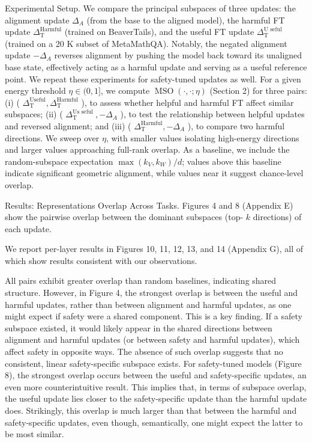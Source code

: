 \documentclass[10pt]{article}
\begin{document}
Experimental Setup. We compare the principal subspaces of three updates: the alignment update $\Delta_{A}$ (from the base to the aligned model), the harmful FT update $\Delta_{\mathrm{T}}^{\mathrm{Harmful}}$ (trained on BeaverTails), and the useful FT update $\Delta_{\mathrm{T}}^{\mathrm{U} \text { seful }}$ (trained on a 20 K subset of MetaMathQA). Notably, the negated alignment update $-\Delta_{A}$ reverses alignment by pushing the model back toward its unaligned base state, effectively acting as a harmful update and serving as a useful reference point. We repeat these experiments for safety-tuned updates as well. For a given energy threshold $\eta \in(0,1]$, we compute $\operatorname{MSO}(\cdot, \cdot ; \eta)$ (Section 2) for three pairs: (i) ( $\Delta_{\mathrm{T}}^{\mathrm{Useful}}, \Delta_{\mathrm{T}}^{\mathrm{Harmful}}$ ), to assess whether helpful and harmful FT affect similar subspaces; (ii) ( $\Delta_{\mathrm{T}}^{\mathrm{Us} \text { seful }},-\Delta_{A}$ ), to test the relationship between helpful updates and reversed alignment; and (iii) ( $\Delta_{\mathrm{T}}^{\mathrm{Harmful}},-\Delta_{A}$ ), to compare two harmful directions. We sweep over $\eta$, with smaller values isolating high-energy directions and larger values approaching full-rank overlap. As a baseline, we include the random-subspace expectation $\max \left(k_{V}, k_{W}\right) / d$; values above this baseline indicate significant geometric alignment, while values near it suggest chance-level overlap.

Results: Representations Overlap Across Tasks. Figures 4 and 8 (Appendix E) show the pairwise overlap between the dominant subspaces (top- $k$ directions) of each update.

We report per-layer results in Figures 10, 11, 12, 13, and 14 (Appendix G), all of which show results consistent with our observations.

All pairs exhibit greater overlap than random baselines, indicating shared structure. However, in Figure 4, the strongest overlap is between the useful and harmful updates, rather than between alignment and harmful updates, as one might expect if safety were a shared component. This is a key finding. If a safety subspace existed, it would likely appear in the shared directions between alignment and harmful updates (or between safety and harmful updates), which affect safety in opposite ways. The absence of such overlap suggests that no consistent, linear safety-specific subspace exists. For safety-tuned models (Figure 8), the strongest overlap occurs between the useful and safety-specific updates, an even more counterintuitive result. This implies that, in terms of subspace overlap, the useful update lies closer to the safety-specific update than the harmful update does. Strikingly, this overlap is much larger than that between the harmful and safety-specific updates, even though, semantically, one might expect the latter to be most similar.
\end{document}
